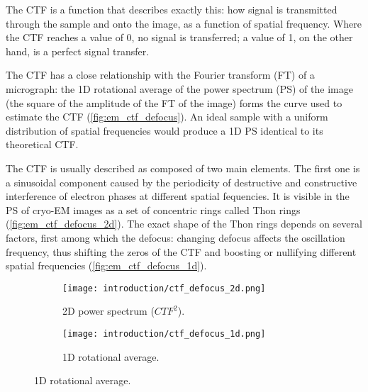 The CTF is a function that describes exactly this: how signal is transmitted through the sample and onto the image, as a function of spatial frequency.
Where the CTF reaches a value of 0, no signal is transferred; a value of 1, on the other hand, is a perfect signal transfer.

The CTF has a close relationship with the Fourier transform (FT) of a micrograph: the 1D rotational average of the power spectrum (PS) of the image (the square of the amplitude of the FT of the image) forms the curve used to estimate the CTF (\autoref{fig:em_ctf_defocus}).
An ideal sample with a uniform distribution of spatial frequencies would produce a 1D PS identical to its theoretical CTF.

The CTF is usually described as composed of two main elements.
The first one is a sinusoidal component caused by the periodicity of destructive and constructive interference of electron phases at different spatial fequencies.
It is visible in the PS of cryo-EM images as a set of concentric rings called Thon rings (\autoref{fig:em_ctf_defocus_2d}).
The exact shape of the Thon rings depends on several factors, first among which the defocus: changing defocus affects the oscillation frequency, thus shifting the zeros of the CTF and boosting or nullifying different spatial frequencies (\autoref{fig:em_ctf_defocus_1d}).

\begin{figure}[ht]
    \centering
    \begin{subfigure}{\textwidth}
        \centering
        \texttt{[image: introduction/ctf\_defocus\_2d.png]}
        \caption{2D power spectrum ($CTF^2$).}
        \label{fig:em_ctf_defocus_2d}
    \end{subfigure}%

    \begin{subfigure}{\textwidth}
        \centering
        \texttt{[image: introduction/ctf\_defocus\_1d.png]}
        \caption{1D rotational average.}
        \label{fig:em_ctf_defocus_1d}
    \end{subfigure}%

    \label{fig:em_ctf_defocus}
\end{figure}

